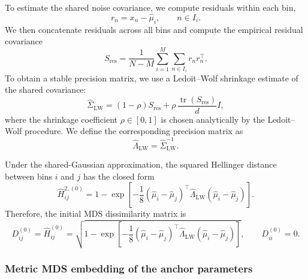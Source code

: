 To estimate the shared noise covariance, we compute residuals within each bin,
\begin{equation}
    r_n=x_n-\widehat\mu_i,
    \qquad n\in I_i.
\end{equation}
We then concatenate residuals across all bins and compute the empirical residual covariance
\begin{equation}
    S_{\mathrm{res}}
    =
    \frac{1}{N-M}
    \sum_{i=1}^M
    \sum_{n\in I_i}
    r_n r_n^\top .
\end{equation}
To obtain a stable precision matrix, we use a Ledoit--Wolf shrinkage estimate of the shared covariance:
\begin{equation}
    \widehat\Sigma_{\mathrm{LW}}
    =
    (1-\rho)S_{\mathrm{res}}
    +
    \rho\,\frac{\operatorname{tr}(S_{\mathrm{res}})}{d}I,
\end{equation}
where the shrinkage coefficient $\rho\in[0,1]$ is chosen analytically by the Ledoit--Wolf procedure. We define the corresponding precision matrix as
\begin{equation}
    \widehat\Lambda_{\mathrm{LW}}
    =
    \widehat\Sigma_{\mathrm{LW}}^{-1}.
\end{equation}

Under the shared-Gaussian approximation, the squared Hellinger distance between bins $i$ and $j$ has the closed form
\begin{equation}
    \widehat H_{ij}^{2,(0)}
    =
    1-
    \exp\left[
    -\frac{1}{8}
    (\widehat\mu_i-\widehat\mu_j)^\top
    \widehat\Lambda_{\mathrm{LW}}
    (\widehat\mu_i-\widehat\mu_j)
    \right].
\end{equation}
Therefore, the initial MDS dissimilarity matrix is
\begin{equation}
    D_{ij}^{(0)}
    =
    \widehat H_{ij}^{(0)}
    =
    \sqrt{
    1-
    \exp\left[
    -\frac{1}{8}
    (\widehat\mu_i-\widehat\mu_j)^\top
    \widehat\Lambda_{\mathrm{LW}}
    (\widehat\mu_i-\widehat\mu_j)
    \right]
    },
    \qquad
    D_{ii}^{(0)}=0.
\end{equation}

\subsubsection{Metric MDS embedding of the anchor parameters}

